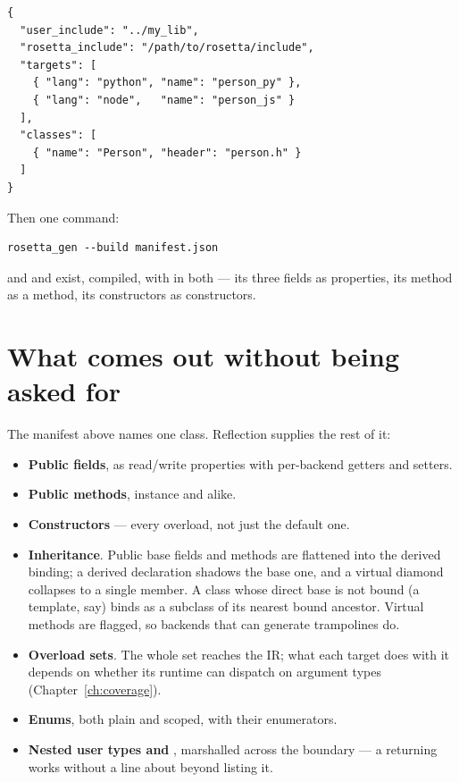 \begin{lstlisting}[style=json]
{
  "user_include": "../my_lib",
  "rosetta_include": "/path/to/rosetta/include",
  "targets": [
    { "lang": "python", "name": "person_py" },
    { "lang": "node",   "name": "person_js" }
  ],
  "classes": [
    { "name": "Person", "header": "person.h" }
  ]
}
\end{lstlisting}

Then one command:

\begin{lstlisting}[style=sh]
rosetta_gen --build manifest.json
\end{lstlisting}

and  and  exist, compiled, with
 in both --- its three fields as properties, its method as a
method, its constructors as constructors.

\section{What comes out without being asked for}

The manifest above names one class. Reflection supplies the rest of it:

\begin{itemize}
  \item \textbf{Public fields}, as read/write properties with per-backend
    getters and setters.
  \item \textbf{Public methods}, instance and  alike.
  \item \textbf{Constructors} --- every overload, not just the default one.
  \item \textbf{Inheritance}. Public base fields and methods are flattened into
    the derived binding; a derived declaration shadows the base one, and a
    virtual diamond collapses to a single member. A class whose direct base is
    not bound (a template, say) binds as a subclass of its nearest bound
    ancestor. Virtual methods are flagged, so backends that can generate
    trampolines do.
  \item \textbf{Overload sets}. The whole set reaches the IR; what each target
    does with it depends on whether its runtime can dispatch on argument types
    (Chapter~\ref{ch:coverage}).
  \item \textbf{Enums}, both plain and scoped, with their enumerators.
  \item \textbf{Nested user types and }, marshalled across
    the boundary --- a  returning 
    works without a line about  beyond listing it.
\end{itemize}


